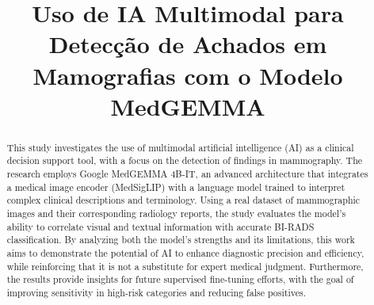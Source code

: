 \documentclass[10pt,conference]{IEEEtran}
\begin{document}
\title{Uso de IA Multimodal para Detecção de Achados em Mamografias com o Modelo MedGEMMA}
\newif\iffinal
\finaltrue
\iffinal
\else
  \author{ID do artigo Latin.science 2020: \cmtid \\ }
\fi
\maketitle
\thispagestyle{fancy}

\begin{abstract}
This study investigates the use of multimodal artificial intelligence (AI) as a clinical decision support tool, with a focus on the detection of findings in mammography. The research employs Google MedGEMMA 4B-IT, an advanced architecture that integrates a medical image encoder (MedSigLIP) with a language model trained to interpret complex clinical descriptions and terminology. Using a real dataset of mammographic images and their corresponding radiology reports, the study evaluates the model's ability to correlate visual and textual information with accurate BI-RADS classification. By analyzing both the model's strengths and its limitations, this work aims to demonstrate the potential of AI to enhance diagnostic precision and efficiency, while reinforcing that it is not a substitute for expert medical judgment. Furthermore, the results provide insights for future supervised fine-tuning efforts, with the goal of improving sensitivity in high-risk categories and reducing false positives.
\end{abstract}
\end{document}
